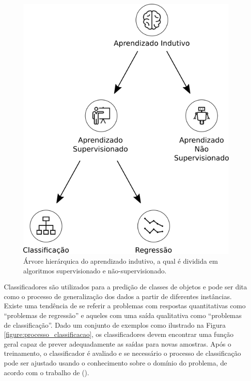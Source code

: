 \begin{figure}[H]
\begin{center}
    \includegraphics[scale=0.40]{images/aprendizado_indutivo.png}
\end{center}
\caption{Árvore hierárquica do aprendizado indutivo, a qual é dividida em 
algoritmos supervisionado e não-supervisionado.}
\label{figure:aprendizado_indutivo}
\end{figure}

Classificadores são utilizados para a predição de classes de objetos e pode ser 
dita como o processo de generalização dos dados a partir de diferentes 
instâncias. Existe uma tendência de se referir a problemas com respostas 
quantitativas como ``problemas de regressão'' e aqueles com uma saída 
qualitativa como ``problemas de classificação''. Dado um conjunto de exemplos 
como ilustrado na Figura \ref{figure:processo_classificacao}, os classificadores 
devem encontrar uma função geral capaz de prever adequadamente as saídas para 
novas amostras. Após o treinamento, o classificador é avaliado e se necessário 
o processo de classificação pode ser ajustado usando o conhecimento sobre o 
domínio do problema, de acordo com o trabalho de 
 (\citeyear{porthos_motta:2016}).

